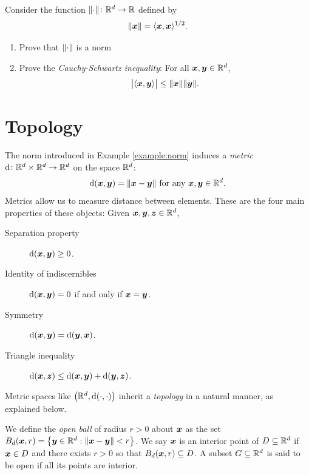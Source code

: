 \begin{problem}\label{problem:norm}
Consider the function $\lVert \cdot \rVert \colon \mathbb{R}^d \to \mathbb{R}$ defined by 
\begin{equation*}
\lVert \boldsymbol{x} \rVert = \langle \boldsymbol{x}, \boldsymbol{x} \rangle^{1/2}.
\end{equation*}
\begin{enumerate}
	\item Prove that $\lVert \cdot \rVert$ is a norm
	\item Prove the \emph{Cauchy-Schwartz inequality}: For all $\boldsymbol{x}, \boldsymbol{y} \in \mathbb{R}^d$, 
	\begin{equation*}
	\big\lvert \langle \boldsymbol{x}, \boldsymbol{y} \rangle \big\rvert \leq \lVert \boldsymbol{x} \rVert \lVert \boldsymbol{y} \rVert.
	\end{equation*}
\end{enumerate}
\end{problem}


\section{Topology}
The norm introduced in Example \ref{example:norm} induces a \emph{metric} $\operatorname{d} \colon \mathbb{R}^d \times \mathbb{R}^d \to \mathbb{R}^d$ on the space $\mathbb{R}^d$: 
\begin{equation*}
\operatorname{d}(\boldsymbol{x},\boldsymbol{y}) = \lVert \boldsymbol{x} - \boldsymbol{y} \rVert \text{ for any }\boldsymbol{x}, \boldsymbol{y} \in \mathbb{R}^d.
\end{equation*}
Metrics allow us to measure distance between elements.  These are the four main properties of these objects:  Given $\boldsymbol{x}, \boldsymbol{y}, \boldsymbol{z} \in \mathbb{R}^d$,
\begin{description}
	\item[Separation property] $\operatorname{d}(\boldsymbol{x},\boldsymbol{y}) \geq 0$.
	\item[Identity of indiscernibles] $\operatorname{d}(\boldsymbol{x}, \boldsymbol{y}) = 0$ if and only if $\boldsymbol{x} = \boldsymbol{y}$.
	\item[Symmetry] $\operatorname{d}(\boldsymbol{x}, \boldsymbol{y}) = \operatorname{d}(\boldsymbol{y}, \boldsymbol{x})$.
	\item[Triangle inequality] $\operatorname{d}(\boldsymbol{x},\boldsymbol{z}) \leq \operatorname{d}(\boldsymbol{x},\boldsymbol{y}) + \operatorname{d}(\boldsymbol{y},\boldsymbol{z})$. 
\end{description}
Metric spaces like $\big( \mathbb{R}^d, \operatorname{d}(\cdot,\cdot) \big)$ inherit a \emph{topology} in a natural manner, as explained below.

We define the \emph{open ball} of radius $r>0$ about $\boldsymbol{x}$ as the set $B_d(\boldsymbol{x},r) = \big\{ \boldsymbol{y} \in \mathbb{R}^d : \lVert \boldsymbol{x}- \boldsymbol{y} \rVert < r \big\}$.  We say $\boldsymbol{x}$ is an interior point of $D \subseteq \mathbb{R}^d$ if $\boldsymbol{x} \in D$ and there exists $r>0$ so that $B_d(\boldsymbol{x}, r) \subseteq D$.  A subset $G \subseteq \mathbb{R}^d$ is said to be open if all its points are interior.

